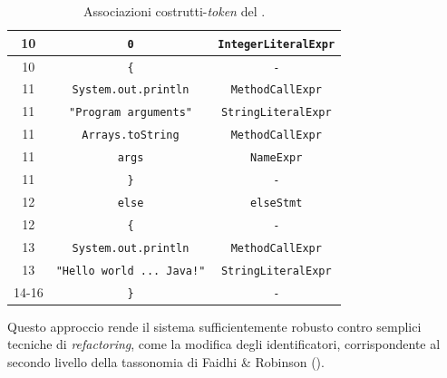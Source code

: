 \begin{table}[h!]
\begin{tabular}{|c|c|c|}
        10  & \texttt{0}                          & \texttt{IntegerLiteralExpr}           \\ \hline
        10  & \texttt{\{}                         & \texttt{-}                            \\ \hline
        11  & \texttt{System.out.println}         & \texttt{MethodCallExpr}               \\ \hline
        11  & \texttt{"Program arguments"}        & \texttt{StringLiteralExpr}            \\ \hline
        11  & \texttt{Arrays.toString}            & \texttt{MethodCallExpr}               \\ \hline
        11  & \texttt{args}                       & \texttt{NameExpr}                     \\ \hline
        11  & \texttt{\}}                         & \texttt{-}                            \\ \hline
        12  & \texttt{else}                       & \texttt{elseStmt}                     \\ \hline
        12  & \texttt{\{}                         & \texttt{-}                            \\ \hline
        13  & \texttt{System.out.println}         & \texttt{MethodCallExpr}               \\ \hline
        13  & \texttt{"Hello world ... Java!"}    & \texttt{StringLiteralExpr}            \\ \hline
        14-16  & \texttt{\}}                         & \texttt{-}                            \\ \hline
    \end{tabular}
    \caption{Associazioni costrutti-\textit{token} del .}
    \label{table:token-associations}
\end{table}

Questo approccio rende il sistema sufficientemente robusto contro semplici tecniche di \textit{refactoring}, come la modifica degli identificatori, corrispondente al secondo livello della tassonomia di Faidhi \& Robinson ().

